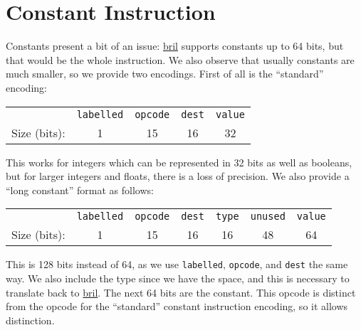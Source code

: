 \documentclass{article}
\newcommand{\bril}{\href{https://capra.cs.cornell.edu/bril/}{bril}}
\begin{document}
\section{Constant Instruction}
Constants present a bit of an issue: \bril{} supports constants up to 64 bits,
but that would be the whole instruction. We also observe that usually constants
are much smaller, so we provide two encodings. First of all is the ``standard''
encoding:\\ 
\begin{center}
  \begin{tabular}{r|c|c|c|c|}
    \cline{2-5}
    & \texttt{labelled} & \texttt{opcode} & \texttt{dest} & \texttt{value}\\
    \cline{2-5}
    Size (bits): & 1 & 15 & 16 & 32 \\ \cline{2-5}
  \end{tabular}
\end{center}
This works for integers which can be represented in 32 bits as well as booleans,
but for larger integers and floats, there is a loss of precision. We also
provide a ``long constant'' format as follows:
\begin{center}
  \begin{tabular}{r|c|c|c|c|c|c|}
    \cline{2-7}
    & \texttt{labelled} & \texttt{opcode} & \texttt{dest} & \texttt{type}
    & \texttt{unused}
    & \texttt{value} \\ \cline{2-7}
    Size (bits): & 1 & 15 & 16 & 16 & 48 & 64 \\ \cline{2-5}
  \end{tabular}
\end{center}
This is 128 bits instead of 64, as we use \texttt{labelled}, \texttt{opcode},
and \texttt{dest}
the same way.
We also include the type since we have the space, and this is necessary to
translate back to \bril{}.
The next 64 bits are the constant. This opcode is distinct
from the opcode for the ``standard'' constant instruction encoding, so it allows
distinction.
\end{document}
